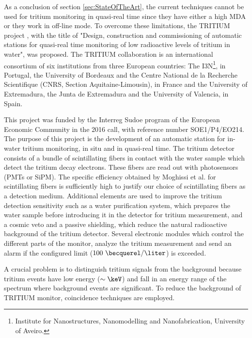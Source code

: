 As a conclusion of section \ref{sec:StateOfTheArt}, the current techniques cannot be used for tritium monitoring in quasi-real time since they have either a high MDA or they work in off-line mode. To overcome these limitations, the TRITIUM project \cite{TRITIUM}, with the title of "Design, construction and commissioning of automatic stations for quasi-real time monitoring of low radioactive levels of tritium in water", was proposed. The TRITIUM collaboration is an international consortium of six institutions from three European countries: The I3N\footnote{Institute for Nanostructures, Nanomodelling and Nanofabrication, University of Aveiro.}, in Portugal, the University of Bordeaux and the Centre National de la Recherche Scientifique (CNRS, Section Aquitaine-Limousin), in France and the University of Extremadura, the Junta de Extremadura and the University of Valencia, in Spain.

This project was funded by the Interreg Sudoe program of the European Economic Community in the 2016 call, with reference number SOE1/P4/EO214. The purpose of this project is the development of an automatic station for in-water tritium monitoring, in situ and in quasi-real time. The tritium detector consists of a bundle of scintillating fibers in contact with the water sample which detect the tritium decay electrons. These fibers are read out with photosensors (PMTs or SiPM). The specific efficiency obtained by Moghissi et al. for scintillating fibers is sufficiently high to justify our choice of scintillating fibers as a detection medium. Additional elements are used to improve the tritium detection sensitivity such as a water purification system, which prepares the water sample before introducing it in the detector for tritium measurement, and a cosmic veto and a passive shielding, which reduce the natural radioactive background of the tritium detector. Several electronic modules which control the different parts of the monitor, analyze the tritium measurement and send an alarm if the configured limit ($100~\becquerel/\liter$) is exceeded.

A crucial problem is to distinguish tritium signals from the background because tritium events have low energy ($\sim\keV$) and fall in an energy range of the spectrum where background events are significant. To reduce the background of TRITIUM monitor, coincidence techniques are employed.


